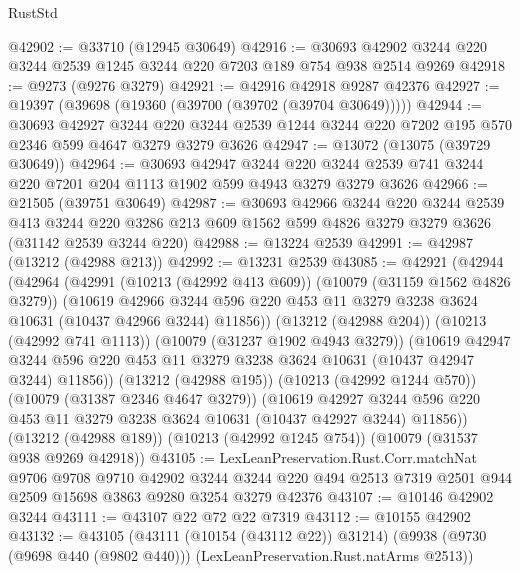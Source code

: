 \begin{lexlean}{RustStd}
\begin{coremodule}
@42902 := @33710 (@12945 @30649)
@42916 := @30693 @42902 @3244 @220 @3244 @2539 @1245 @3244 @220 @7203 @189 @754 @938 @2514 @9269
@42918 := @9273 (@9276 @3279)
@42921 := @42916 @42918 @9287 @42376
@42927 := @19397 (@39698 (@19360 (@39700 (@39702 (@39704 @30649)))))
@42944 := @30693
    @42927
    @3244
    @220
    @3244
    @2539
    @1244
    @3244
    @220
    @7202
    @195
    @570
    @2346
    @599
    @4647
    @3279
    @3279
    @3626
@42947 := @13072 (@13075 (@39729 @30649))
@42964 := @30693
    @42947
    @3244
    @220
    @3244
    @2539
    @741
    @3244
    @220
    @7201
    @204
    @1113
    @1902
    @599
    @4943
    @3279
    @3279
    @3626
@42966 := @21505 (@39751 @30649)
@42987 := @30693
    @42966
    @3244
    @220
    @3244
    @2539
    @413
    @3244
    @220
    @3286
    @213
    @609
    @1562
    @599
    @4826
    @3279
    @3279
    @3626
    (@31142 @2539 @3244 @220)
@42988 := @13224 @2539
@42991 := @42987 (@13212 (@42988 @213))
@42992 := @13231 @2539
@43085 := @42921
    (@42944
      (@42964
        (@42991
          (@10213 (@42992 @413 @609))
          (@10079 (@31159 @1562 @4826 @3279))
          (@10619
            @42966
            @3244
            @596
            @220
            @453
            @11
            @3279
            @3238
            @3624
            @10631
            (@10437 @42966 @3244)
            @11856))
        (@13212 (@42988 @204))
        (@10213 (@42992 @741 @1113))
        (@10079 (@31237 @1902 @4943 @3279))
        (@10619
          @42947
          @3244
          @596
          @220
          @453
          @11
          @3279
          @3238
          @3624
          @10631
          (@10437 @42947 @3244)
          @11856))
      (@13212 (@42988 @195))
      (@10213 (@42992 @1244 @570))
      (@10079 (@31387 @2346 @4647 @3279))
      (@10619
        @42927
        @3244
        @596
        @220
        @453
        @11
        @3279
        @3238
        @3624
        @10631
        (@10437 @42927 @3244)
        @11856))
    (@13212 (@42988 @189))
    (@10213 (@42992 @1245 @754))
    (@10079 (@31537 @938 @9269 @42918))
@43105 := LexLeanPreservation.Rust.Corr.matchNat
    @9706
    @9708
    @9710
    @42902
    @3244
    @3244
    @220
    @494
    @2513
    @7319
    @2501
    @944
    @2509
    @15698
    @3863
    @9280
    @3254
    @3279
    @42376
@43107 := @10146 @42902 @3244
@43111 := @43107 @22 @72 @22 @7319
@43112 := @10155 @42902
@43132 := @43105
    (@43111 (@10154 (@43112 @22)) @31214)
    (@9938 (@9730 (@9698 @440 (@9802 @440))) (LexLeanPreservation.Rust.natArms @2513))

\end{coremodule}
\end{lexlean}
